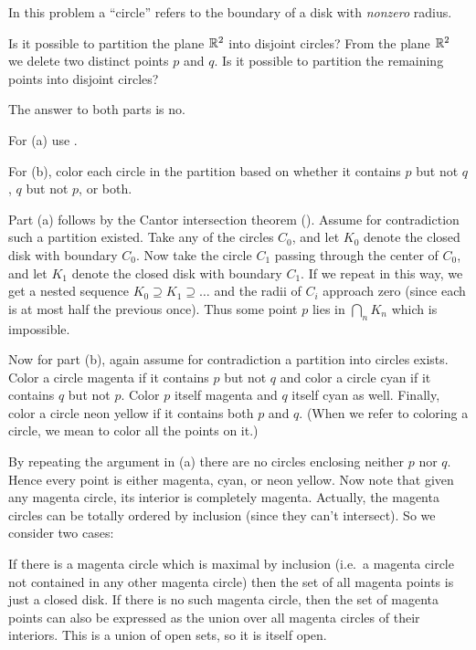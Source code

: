 \begin{problem}
	\yod
	In this problem a ``circle''
	refers to the boundary of a disk with \emph{nonzero} radius.
	\begin{enumerate}[(a)]
		\ii Is it possible to partition the plane $\mathbb R^2$
		into disjoint circles?
		\ii From the plane $\mathbb R^2$ we delete two distinct points $p$ and $q$.
		Is it possible to partition the remaining points into disjoint circles?
	\end{enumerate}
	\begin{hint}
		The answer to both parts is no.

		For (a) use .

		For (b), color each circle in the partition
		based on whether it contains $p$ but not $q$,
		$q$ but not $p$, or both.
	\end{hint}
	\begin{sol}
		Part (a) follows by the Cantor intersection theorem
		().
		Assume for contradiction such a partition existed.
		Take any of the circles $C_0$, and let $K_0$ denote the closed disk
		with boundary $C_0$.
		Now take the circle $C_1$ passing through the center of $C_0$,
		and let $K_1$ denote the closed disk with boundary $C_1$.
		If we repeat in this way,
		we get a nested sequence $K_0 \supseteq K_1 \supseteq \dots$
		and the radii of $C_i$ approach zero
		(since each is at most half the previous once).
		Thus some point $p$ lies in $\bigcap_n K_n$ which is impossible.

		Now for part (b),
		again assume for contradiction a partition into circles exists.
		Color a circle magenta if it contains $p$ but not $q$
		and color a circle cyan if it contains $q$ but not $p$.
		Color $p$ itself magenta and $q$ itself cyan as well.
		Finally, color a circle neon yellow if it contains both $p$ and $q$.
		(When we refer to coloring a circle,
		we mean to color all the points on it.)

		By repeating the argument in (a) there are no circles
		enclosing neither $p$ nor $q$.
		Hence every point is either magenta, cyan, or neon yellow.
		Now note that given any magenta circle,
		its interior is completely magenta.
		Actually, the magenta circles can be totally ordered
		by inclusion (since they can't intersect).
		So we consider two cases:
		\begin{itemize}
		 \ii If there is a magenta circle which is maximal by inclusion
		 (i.e.\ a magenta circle not contained in any other magenta circle)
		 then the set of all magenta points is just a closed disk.
		 \ii If there is no such magenta circle,
		 then the set of magenta points can also be expressed
		 as the union over all magenta circles of their interiors.
		 This is a union of open sets, so it is itself open.
		 \end{itemize}


\end{sol}
\end{problem}
